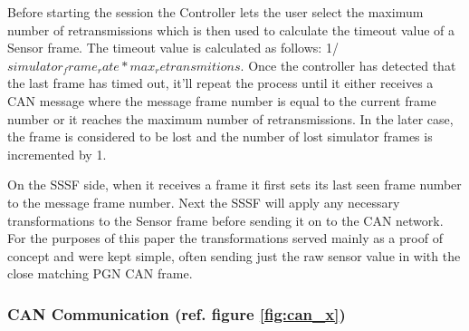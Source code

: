 \documentclass[letterpaper,twocolumn,12pt]{article}
\begin{document}
Before starting the session the Controller lets the user select the maximum number of retransmissions which is then used to calculate the timeout value of a Sensor frame. The timeout value is calculated as follows: %
 1/\(simulator_frame_rate * max_retransmitions\).
Once the controller has detected that the last frame has timed out, it’ll repeat the process until it either receives a CAN message where the message frame number is equal to the current frame number or it reaches the maximum number of retransmissions. In the later case, the frame is considered to be lost and the number of lost simulator frames is incremented by 1.

On the SSSF side, when it receives a frame it first sets its last seen frame number to the message frame number. Next the SSSF will apply any necessary transformations to the Sensor frame before sending it on to the CAN network. For the purposes of this paper the transformations served mainly as a proof of concept and were kept simple, often sending just the raw sensor value in with the close matching PGN CAN frame.

\subsubsection{CAN Communication (ref. figure \ref{fig:can_x})}
\end{document}
